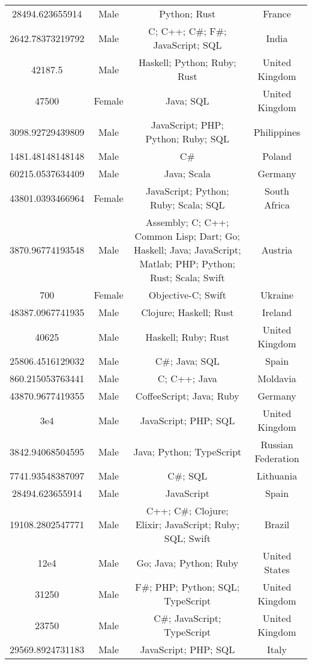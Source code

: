 \begin{center}
\begin{tabular}{ |c|c|c|c| }
28494.623655914  &  Male  &  Python; Rust  &  France  \\ 
2642.78373219792  &  Male  &  C; C++; C\#; F\#; JavaScript; SQL  &  India  \\ 
42187.5  &  Male  &  Haskell; Python; Ruby; Rust  &  United Kingdom  \\ 
47500  &  Female  &  Java; SQL  &  United Kingdom  \\ 
3098.92729439809  &  Male  &  JavaScript; PHP; Python; Ruby; SQL  &  Philippines  \\ 
1481.48148148148  &  Male  &  C\#  &  Poland  \\ 
60215.0537634409  &  Male  &  Java; Scala  &  Germany  \\ 
43801.0393466964  &  Female  &  JavaScript; Python; Ruby; Scala; SQL  &  South Africa  \\ 
3870.96774193548  &  Male  &  Assembly; C; C++; Common Lisp; Dart; Go; Haskell; Java; JavaScript; Matlab; PHP; Python; Rust; Scala; Swift  &  Austria  \\ 
700  &  Female  &  Objective-C; Swift  &  Ukraine  \\ 
48387.0967741935  &  Male  &  Clojure; Haskell; Rust  &  Ireland  \\ 
40625  &  Male  &  Haskell; Ruby; Rust  &  United Kingdom  \\ 
25806.4516129032  &  Male  &  C\#; Java; SQL  &  Spain  \\ 
860.215053763441  &  Male  &  C; C++; Java  &  Moldavia  \\ 
43870.9677419355  &  Male  &  CoffeeScript; Java; Ruby  &  Germany  \\ 
3e4  &  Male  &  JavaScript; PHP; SQL  &  United Kingdom  \\ 
3842.94068504595  &  Male  &  Java; Python; TypeScript  &  Russian Federation  \\ 
7741.93548387097  &  Male  &  C\#; SQL  &  Lithuania  \\ 
28494.623655914  &  Male  &  JavaScript  &  Spain  \\ 
19108.2802547771  &  Male  &  C++; C\#; Clojure; Elixir; JavaScript; Ruby; SQL; Swift  &  Brazil  \\ 
12e4  &  Male  &  Go; Java; Python; Ruby  &  United States  \\ 
31250  &  Male  &  F\#; PHP; Python; SQL; TypeScript  &  United Kingdom  \\ 
23750  &  Male  &  C\#; JavaScript; TypeScript  &  United Kingdom  \\ 
29569.8924731183  &  Male  &  JavaScript; PHP; SQL  &  Italy  \\ 

\end{tabular}
\end{center}
